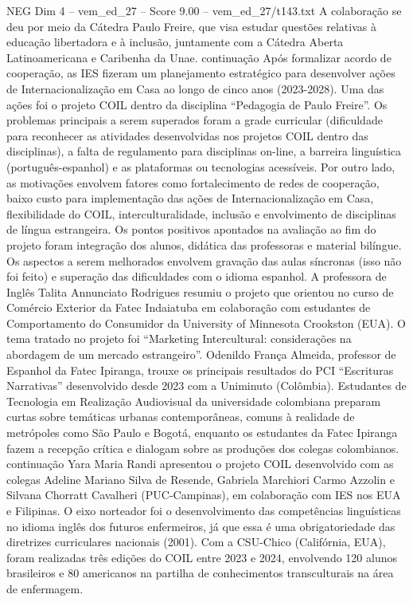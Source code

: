 \begin{textsample}{NEG Dim 4 – vem\_ed\_27 – Score 9.00 – vem\_ed\_27/t143.txt}
A colaboração se deu por meio da Cátedra Paulo Freire, que visa estudar questões relativas à educação libertadora e à inclusão, juntamente com a Cátedra Aberta Latinoamericana e Caribenha da Unae. continuação Após formalizar acordo de cooperação, as IES fizeram um planejamento estratégico para desenvolver ações de Internacionalização em Casa ao longo de cinco anos (2023-2028).
Uma das ações foi o projeto COIL dentro da disciplina “Pedagogia de Paulo Freire”.
Os problemas principais a serem superados foram a grade curricular (dificuldade para reconhecer as atividades desenvolvidas nos projetos COIL dentro das disciplinas), a falta de regulamento para disciplinas on-line, a barreira linguística (português-espanhol) e as plataformas ou tecnologias acessíveis.
Por outro lado, as motivações envolvem fatores como fortalecimento de redes de cooperação, baixo custo para implementação das ações de Internacionalização em Casa, flexibilidade do COIL, interculturalidade, inclusão e envolvimento de disciplinas de língua estrangeira.
Os pontos positivos apontados na avaliação ao fim do projeto foram integração dos alunos, didática das professoras e material bilíngue.
Os aspectos a serem melhorados envolvem gravação das aulas síncronas (isso não foi feito) e superação das dificuldades com o idioma espanhol.
A professora de Inglês Talita Annunciato Rodrigues resumiu o projeto que orientou no curso de Comércio Exterior da Fatec Indaiatuba em colaboração com estudantes de Comportamento do Consumidor da University of Minnesota Crookston (EUA).
O tema tratado no projeto foi “Marketing Intercultural: considerações na abordagem de um mercado estrangeiro”.
Odenildo França Almeida, professor de Espanhol da Fatec Ipiranga, trouxe os principais resultados do PCI “Escrituras Narrativas” desenvolvido desde 2023 com a Uniminuto (Colômbia).
Estudantes de Tecnologia em Realização Audiovisual da universidade colombiana preparam curtas sobre temáticas urbanas contemporâneas, comuns à realidade de metrópoles como São Paulo e Bogotá, enquanto os estudantes da Fatec Ipiranga fazem a recepção crítica e dialogam sobre as produções dos colegas colombianos. continuação Yara Maria Randi apresentou o projeto COIL desenvolvido com as colegas Adeline Mariano Silva de Resende, Gabriela Marchiori Carmo Azzolin e Silvana Chorratt Cavalheri (PUC-Campinas), em colaboração com IES nos EUA e Filipinas.
O eixo norteador foi o desenvolvimento das competências linguísticas no idioma inglês dos futuros enfermeiros, já que essa é uma obrigatoriedade das diretrizes curriculares nacionais (2001).
Com a CSU-Chico (Califórnia, EUA), foram realizadas três edições do COIL entre 2023 e 2024, envolvendo 120 alunos brasileiros e 80 americanos na partilha de conhecimentos transculturais na área de enfermagem.

\end{textsample}
